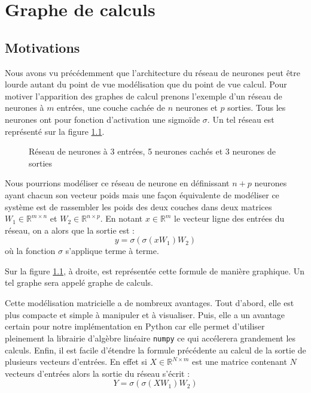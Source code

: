 \chapter{Graphe de calculs}

\section{Motivations}

Nous avons vu précédemment que l'architecture du réseau de neurones peut être lourde autant du point de vue modélisation que du point de vue calcul. Pour motiver l'apparition des graphes de calcul prenons l'exemple d'un réseau de neurones à $m$ entrées, une couche cachée de $n$ neurones et $p$ sorties. Tous les neurones ont pour fonction d'activation une sigmoïde $\sigma$. Un tel réseau est représenté sur la figure \ref{reseau_3_5_3}.

\begin{figure}
\begin{center}

\end{center}
\caption{Réseau de neurones à 3 entrées, 5 neurones cachés et 3 neurones de sorties}
\label{reseau_3_5_3}
\end{figure}

Nous pourrions modéliser ce réseau de neurone en définissant $n+p$ neurones ayant chacun son vecteur poids mais une façon équivalente de modéliser ce système est de rassembler les poids des deux couches dans deux matrices $W_1 \in \mathbb{R}^{m \times n}$ et $W_2 \in \mathbb{R}^{n \times p}$. En notant $x \in \mathbb{R}^m$ le vecteur ligne des entrées du réseau, on a alors que la sortie est :
\begin{equation}
y = \sigma(\sigma(xW_1)W_2)
\label{eq_3_5_3}
\end{equation}
où la fonction $\sigma$ s'applique terme à terme. 

Sur la figure \ref{reseau_3_5_3}, à droite, est représentée cette formule de manière graphique. Un tel graphe sera appelé graphe de calculs.

Cette modélisation matricielle a de nombreux avantages. Tout d'abord, elle est plus compacte et simple à manipuler et à visualiser. Puis, elle a un avantage certain pour notre implémentation en Python car elle permet d'utiliser pleinement la librairie d'algèbre linéaire \texttt{numpy} ce qui accélerera grandement les calculs. Enfin, il est facile d'étendre la formule précédente au calcul de la sortie de plusieurs vecteurs d'entrées. En effet si $X \in \mathbb{R}^{N \times m}$ est une matrice contenant $N$ vecteurs d'entrées alors la sortie du réseau s'écrit :
$$Y = \sigma(\sigma(XW_1)W_2)$$

